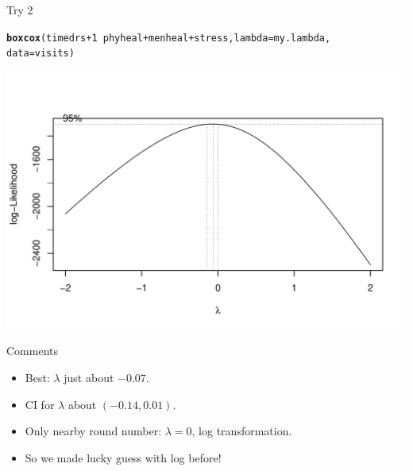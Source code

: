 \documentclass[unknownkeysallowed]{beamer}\usepackage[]{graphicx}\usepackage[]{color}
\makeatletter
\def\maxwidth{ %
  \ifdim\Gin@nat@width>\linewidth
    \linewidth
  \else
    \Gin@nat@width
  \fi
}
\newcommand{\hlnum}[1]{\textcolor[rgb]{0.686,0.059,0.569}{#1}}%
\newcommand{\hlopt}[1]{\textcolor[rgb]{0,0,0}{#1}}%
\newcommand{\hlstd}[1]{\textcolor[rgb]{0.345,0.345,0.345}{#1}}%
\newcommand{\hlkwc}[1]{\textcolor[rgb]{0.333,0.667,0.333}{#1}}%
\newcommand{\hlkwd}[1]{\textcolor[rgb]{0.737,0.353,0.396}{\textbf{#1}}}%
\newenvironment{kframe}{%
 \def\at@end@of@kframe{}%
 \ifinner\ifhmode%
  \def\at@end@of@kframe{\end{minipage}}%
  \begin{minipage}{\columnwidth}%
 \fi\fi%
 \def\FrameCommand##1{\hskip\@totalleftmargin \hskip-\fboxsep
 \colorbox{shadecolor}{##1}\hskip-\fboxsep
     \hskip-\linewidth \hskip-\@totalleftmargin \hskip\columnwidth}%
 \MakeFramed {\advance\hsize-\width
   \@totalleftmargin\z@ \linewidth\hsize
   \@setminipage}}%
 {\par\unskip\endMakeFramed%
 \at@end@of@kframe}
\newenvironment{knitrout}{}{} %
\makeatother
\begin{document}
\begin{frame}[fragile]{Try 2}

 
\begin{knitrout}
\color{fgcolor}\begin{kframe}
\begin{alltt}
\hlkwd{boxcox}\hlstd{(timedrs}\hlopt{+}\hlnum{1}\hlopt{~}\hlstd{phyheal}\hlopt{+}\hlstd{menheal}\hlopt{+}\hlstd{stress,}\hlkwc{lambda}\hlstd{=my.lambda,}
  \hlkwc{data}\hlstd{=visits)}
\end{alltt}
\end{kframe}
\includegraphics[width=\maxwidth]{figure/unnamed-chunk-40-1} 

\end{knitrout}

  

\end{frame}

\begin{frame}[fragile]{Comments}
  
\begin{itemize}
\item Best: $\lambda$ just about $-0.07$.
\item CI for $\lambda$ about $(-0.14,0.01)$.
\item Only nearby round number: $\lambda=0$, log transformation.
\item So we made lucky guess with log before!
\end{itemize}
  
  
\end{frame}
\end{document}
